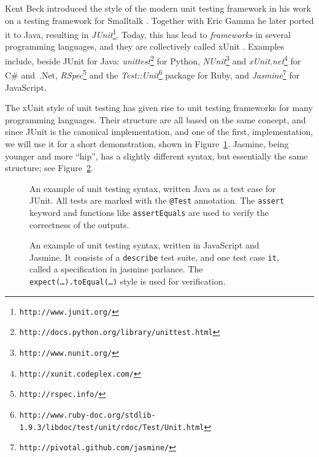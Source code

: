\documentclass[a4paper,11pt]{kth-mag}
\theoremstyle{definition}
\begin{document}
Kent Beck introduced the style of the modern unit testing framework in his work
on a testing framework for Smalltalk \cite{becksmalltalktesting}. Together
with Eric Gamma he later ported it to Java, resulting in
\textit{JUnit}\footnote{\texttt{http://www.junit.org/}}.
Today, this has lead to \textit{frameworks} in several programming languages,
and they are collectively called xUnit \cite{fowlerxunit}. Examples include,
beside JUnit for Java:
\textit{unittest}\footnote{\texttt{http://docs.python.org/library/unittest.html}}
for Python,
\textit{NUnit}\footnote{\texttt{http://www.nunit.org/}} and
\textit{xUnit.net}\footnote{\texttt{http://xunit.codeplex.com/}} for C\#
and~.Net,
\textit{RSpec}\footnote{\texttt{http://rspec.info/}} and the
\textit{Test::Unit}\footnote{\texttt{http://www.ruby-doc.org/stdlib-1.9.3/libdoc/test/unit/rdoc/Test/Unit.html}}
package for Ruby,
and \textit{Jasmine}\footnote{\texttt{http://pivotal.github.com/jasmine/}} for
JavaScript.

The xUnit style of unit testing \cite{fowlerxunit} has given rise to unit
testing frameworks for many programming languages. Their structure are all
based on the same concept, and since JUnit is the canonical implementation, and
one of the first, implementation, we will use it for a short demonstration,
shown in Figure~\ref{figure-junit}. Jasmine, being younger and more ``hip'',
has a slightly different syntax, but essentially the same structure; see
Figure~\ref{figure-jasmine}.

\begin{figure}[h!]
	\begin{center}
	\begin{minipage}{0.9\textwidth}
		\lstset{language=Java}
		
	\end{minipage}
	\end{center}
  \caption{An example of unit testing syntax, written Java as a test case for
    JUnit. All tests are marked with the \texttt{@Test} annotation. The
    \texttt{assert} keyword and functions like \texttt{assertEquals} are used
    to verify the correctness of the outputs.}
	\label{figure-junit}
\end{figure}

\begin{figure}[h!]
	\begin{center}
	\begin{minipage}{0.9\textwidth}
		\lstset{language=JavaScript}
		
	\end{minipage}
	\end{center}
  \caption{An example of unit testing syntax, written in JavaScript and
    Jasmine. It consists of a \texttt{describe} test suite, and one test case
    \texttt{it}, called a specification in jasmine parlance. The
    \texttt{expect(\dots).toEqual(\dots)} style is used for verification.}
	\label{figure-jasmine}
\end{figure}
\end{document}
